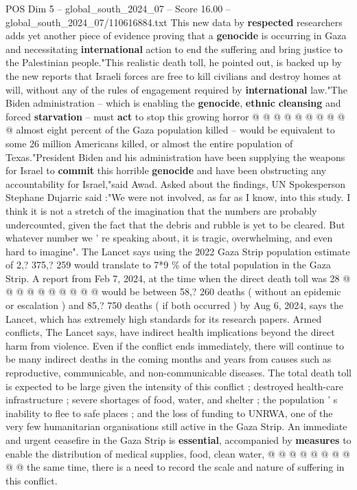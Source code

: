 \begin{textsample}{POS Dim 5 – global\_south\_2024\_07 – Score 16.00 – global\_south\_2024\_07/110616884.txt}
This new data by \textbf{respected} researchers adds yet another piece of evidence proving that a \textbf{genocide} is occurring in Gaza and necessitating \textbf{international} action to end the suffering and bring justice to the Palestinian people."This realistic death toll, he pointed out, is backed up by the new reports that Israeli forces are free to kill civilians and destroy homes at will, without any of the rules of engagement required by \textbf{international} law."The Biden administration -- which is enabling the \textbf{genocide}, \textbf{ethnic} \textbf{cleansing} and forced \textbf{starvation} -- must \textbf{act} to stop this growing horror @ @ @ @ @ @ @ @ @ @ almost eight percent of the Gaza population killed -- would be equivalent to some 26 million Americans killed, or almost the entire population of Texas."President Biden and his administration have been supplying the weapons for Israel to \textbf{commit} this horrible \textbf{genocide} and have been obstructing any accountability for Israel,"said Awad.
Asked about the findings, UN Spokesperson Stephane Dujarric said :"We were not involved, as far as I know, into this study.
I think it is not a stretch of the imagination that the numbers are probably undercounted, given the fact that the debris and rubble is yet to be cleared.
But whatever number we ' re speaking about, it is tragic, overwhelming, and even hard to imagine".
The Lancet says using the 2022 Gaza Strip population estimate of 2,? 375,? 259 would translate to 7*9 \% of the total population in the Gaza Strip.
A report from Feb 7, 2024, at the time when the direct death toll was 28 @ @ @ @ @ @ @ @ @ @ would be between 58,? 260 deaths ( without an epidemic or escalation ) and 85,? 750 deaths ( if both occurred ) by Aug 6, 2024, says the Lancet, which has extremely high standards for its research papers.
Armed conflicts, The Lancet says, have indirect health implications beyond the direct harm from violence.
Even if the conflict ends immediately, there will continue to be many indirect deaths in the coming months and years from causes such as reproductive, communicable, and non-communicable diseases.
The total death toll is expected to be large given the intensity of this conflict ; destroyed health-care infrastructure ; severe shortages of food, water, and shelter ; the population ' s inability to flee to safe places ; and the loss of funding to UNRWA, one of the very few humanitarian organisations still active in the Gaza Strip.
An immediate and urgent ceasefire in the Gaza Strip is \textbf{essential}, accompanied by \textbf{measures} to enable the distribution of medical supplies, food, clean water, @ @ @ @ @ @ @ @ @ @ the same time, there is a need to record the scale and nature of suffering in this conflict.

\end{textsample}
